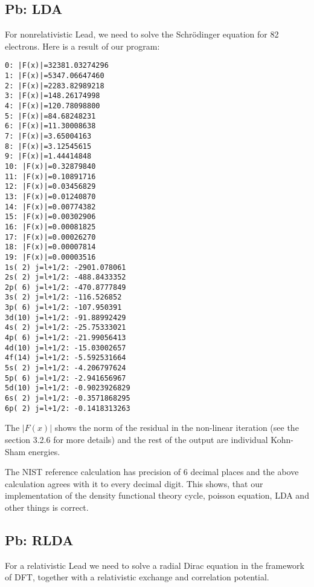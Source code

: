 \subsection{Pb: LDA}

For nonrelativistic Lead, we need to solve the Schr\"odinger equation for 82
electrons. Here is a result of our program:

\begin{lstlisting}
0: |F(x)|=32381.03274296
1: |F(x)|=5347.06647460
2: |F(x)|=2283.82989218
3: |F(x)|=148.26174998
4: |F(x)|=120.78098800
5: |F(x)|=84.68248231
6: |F(x)|=11.30008638
7: |F(x)|=3.65004163
8: |F(x)|=3.12545615
9: |F(x)|=1.44414848
10: |F(x)|=0.32879840
11: |F(x)|=0.10891716
12: |F(x)|=0.03456829
13: |F(x)|=0.01240870
14: |F(x)|=0.00774382
15: |F(x)|=0.00302906
16: |F(x)|=0.00081825
17: |F(x)|=0.00026270
18: |F(x)|=0.00007814
19: |F(x)|=0.00003516
1s( 2) j=l+1/2: -2901.078061
2s( 2) j=l+1/2: -488.8433352
2p( 6) j=l+1/2: -470.8777849
3s( 2) j=l+1/2: -116.526852
3p( 6) j=l+1/2: -107.950391
3d(10) j=l+1/2: -91.88992429
4s( 2) j=l+1/2: -25.75333021
4p( 6) j=l+1/2: -21.99056413
4d(10) j=l+1/2: -15.03002657
4f(14) j=l+1/2: -5.592531664
5s( 2) j=l+1/2: -4.206797624
5p( 6) j=l+1/2: -2.941656967
5d(10) j=l+1/2: -0.9023926829
6s( 2) j=l+1/2: -0.3571868295
6p( 2) j=l+1/2: -0.1418313263
\end{lstlisting}

The $|F(x)|$ shows the norm of the residual in the non-linear iteration (see
the section 3.2.6 for more details) and the rest of the output are individual
Kohn-Sham energies.

The NIST reference calculation\cite{nist} has precision of 6 decimal places and
the above calculation agrees with it to every decimal digit.
This shows, that our implementation of the density functional theory cycle,
poisson equation, LDA and other things is correct.

\subsection{Pb: RLDA}

For a relativistic Lead we need to solve a radial Dirac equation in the
framework of DFT, together with a relativistic exchange and correlation
potential.

